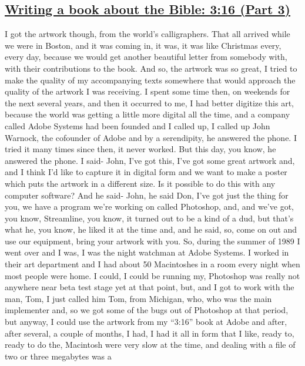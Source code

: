 \documentclass[]{article}
\begin{document}
\subsection{\texorpdfstring{\href{http://webofstories.com/play/17133}{Writing
a book about the Bible: 3:16 (Part
3)}}{Writing a book about the Bible: 3:16 (Part 3)}}\label{writing-a-book-about-the-bible-316-part-3}

I got the artwork though, from the world's calligraphers. That all
arrived while we were in Boston, and it was coming in, it was, it was
like Christmas every, every day, because we would get another beautiful
letter from somebody with, with their contributions to the book. And so,
the artwork was so great, I tried to make the quality of my accompanying
texts somewhere that would approach the quality of the artwork I was
receiving. I spent some time then, on weekends for the next several
years, and then it occurred to me, I had better digitize this art,
because the world was getting a little more digital all the time, and a
company called Adobe Systems had been founded and I called up, I called
up John Warnock, the cofounder of Adobe and by a serendipity, he
answered the phone. I tried it many times since then, it never worked.
But this day, you know, he answered the phone. I said- John, I've got
this, I've got some great artwork and, and I think I'd like to capture
it in digital form and we want to make a poster which puts the artwork
in a different size. Is it possible to do this with any computer
software? And he said- John, he said Don, I've got just the thing for
you, we have a program we're working on called Photoshop, and, and we've
got, you know, Streamline, you know, it turned out to be a kind of a
dud, but that's what he, you know, he liked it at the time and, and he
said, so, come on out and use our equipment, bring your artwork with
you. So, during the summer of 1989 I went over and I was, I was the
night watchman at Adobe Systems. I worked in their art department and I
had about 50 Macintoshes in a room every night when most people were
home. I could, I could be running my, Photoshop was really not anywhere
near beta test stage yet at that point, but, and I got to work with the
man, Tom, I just called him Tom, from Michigan, who, who was the main
implementer and, so we got some of the bugs out of Photoshop at that
period, but anyway, I could use the artwork from my ``3:16'' book at
Adobe and after, after several, a couple of months, I had, I had it all
in form that I like, ready to, ready to do the, Macintosh were very slow
at the time, and dealing with a file of two or three megabytes was a
\end{document}
